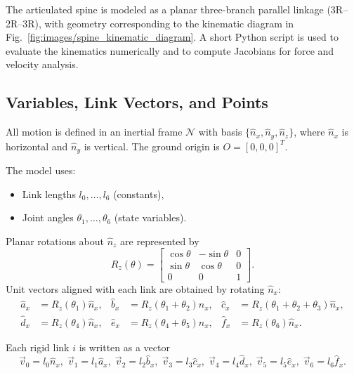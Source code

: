 \documentclass[11pt,letterpaper]{article}
\begin{document}
The articulated spine is modeled as a planar three-branch parallel linkage
(3R–2R–3R), with geometry corresponding to the kinematic diagram in
Fig.~\ref{fig:images/spine_kinematic_diagram}. A short Python script is used to
evaluate the kinematics numerically and to compute Jacobians for force and
velocity analysis.

\subsection{Variables, Link Vectors, and Points}

All motion is defined in an inertial frame $\mathcal{N}$ with basis
$\{\hat{n}_x,\hat{n}_y,\hat{n}_z\}$, where $\hat{n}_x$ is horizontal and
$\hat{n}_y$ is vertical. The ground origin is $O = [0,0,0]^T$.

The model uses:
\begin{itemize}
    \item Link lengths $l_0,\dots,l_6$ (constants),
    \item Joint angles $\theta_1,\dots,\theta_6$ (state variables).
\end{itemize}

Planar rotations about $\hat{n}_z$ are represented by
\begin{equation}
    R_z(\theta) =
    \begin{bmatrix}
        \cos\theta & -\sin\theta & 0 \\
        \sin\theta &  \cos\theta & 0 \\
        0          &  0          & 1
    \end{bmatrix}.
\end{equation}
Unit vectors aligned with each link are obtained by rotating $\hat{n}_x$:
\begin{align}
    \hat{a}_x &= R_z(\theta_1)\hat{n}_x, &
    \hat{b}_x &= R_z(\theta_1+\theta_2)\hat{n}_x, &
    \hat{c}_x &= R_z(\theta_1+\theta_2+\theta_3)\hat{n}_x, \\
    \hat{d}_x &= R_z(\theta_4)\hat{n}_x, &
    \hat{e}_x &= R_z(\theta_4+\theta_5)\hat{n}_x, &
    \hat{f}_x &= R_z(\theta_6)\hat{n}_x.
\end{align}

Each rigid link $i$ is written as a vector
\begin{equation}
    \vec{v}_0 = l_0 \hat{n}_x,\;
    \vec{v}_1 = l_1 \hat{a}_x,\;
    \vec{v}_2 = l_2 \hat{b}_x,\;
    \vec{v}_3 = l_3 \hat{c}_x,\;
    \vec{v}_4 = l_4 \hat{d}_x,\;
    \vec{v}_5 = l_5 \hat{e}_x,\;
    \vec{v}_6 = l_6 \hat{f}_x.
\end{equation}
\end{document}
